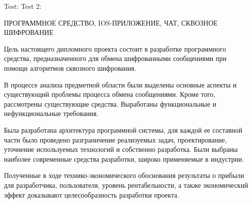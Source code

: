 \thispagestyle{empty}


\begin{center}
	Test: \totalpages
	Test 2: \totfig{}

	\MakeUppercase{Программное средство, iOS-приложение, чат, сквозное шифрование}
\end{center}

Цель настоящего дипломного проекта состоит в разработке программного средства, предназначенного для обмена шифрованными сообщениями при помощи алгоритмов сквозного шифрования. 

В процессе анализа предметной области были выделены основные аспекты и существующий проблемы процесса обмена сообщениями. Кроме того, рассмотрены существующие средства. Выработаны функциональные и нефункциональные требования.

Была разработана архитектура программной системы, для каждой ее составной части было проведено разграничение реализуемых задач, проектирование, уточнение используемых технологий и собственно разработка. Были выбраны наиболее современные средства разработки, широко применяемые в индустрии. 

Полученные в ходе технико-экономического обоснования результаты о прибыли для разработчика, пользователя, уровень рентабельности, а также экономический эффект доказывают целесообразность разработки про\-екта.
